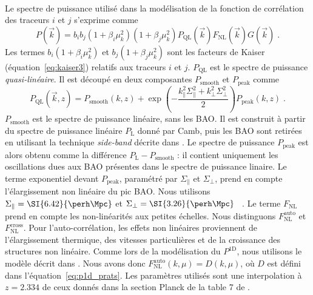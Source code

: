 \paragraph{}
Le spectre de puissance utilisé dans la modélisation de la fonction de corrélation des traceurs $i$ et $j$ s'exprime comme
\begin{equation}
  \label{eq:pk_model1}
  P(\vec k) = b_i b_j (1+\beta_i \mu_k^2)(1+\beta_j \mu_k^2) P_{\mathrm{QL}}(\vec k) F_{\mathrm{NL}}(\vec k) G(\vec k) \; .
\end{equation}
Les termes $b_i (1+\beta_i \mu_k^2)$ et $b_j (1+\beta_j \mu_k^2)$ sont les facteurs de Kaiser (équation~\ref{eq:kaiser3}) relatifs aux traceurs $i$ et $j$.
$P_{\mathrm{QL}}$ est le spectre de puissance \emph{quasi-linéaire}. Il est découpé en deux composantes $P_{\mathrm{smooth}}$ et $P_{\mathrm{peak}}$ comme
\begin{equation}
  \label{eq:pk_ql}
  P_{\mathrm{QL}}(\vec k, z) = P_{\mathrm{smooth}}(k, z) + \exp(- \frac{k_{\parallel}^2 \Sigma_{\parallel}^2 + k_{\perp}^2 \Sigma_{\perp}^2}{2}) P_{\mathrm{peak}}(k,z) \; .
\end{equation}
$P_{\mathrm{smooth}}$ est le spectre de puissance linéaire, sans les BAO. Il est construit à partir du spectre de puissance linéaire $P_{\mathrm{L}}$ donné par Camb, puis les BAO sont retirées en utilisant la technique \emph{side-band} décrite dans \textcite{Kirkby2013}.
Le spectre de puissance $P_{\mathrm{peak}}$ est alors obtenu comme la différence $P_{\mathrm{L}} - P_{\mathrm{smooth}}$ : il contient uniquement les oscillations dues aux BAO présentes dans le spectre de puissance linaire.
Le terme exponentiel devant $P_{\mathrm{peak}}$, paramétré par $\Sigma_{\parallel}$ et $\Sigma_{\perp}$, prend en compte l'élargissement non linéaire du pic BAO. Nous utilisons $\Sigma_{\parallel} = \SI{6.42}{\perh\Mpc}$ et $\Sigma_{\perp} = \SI{3.26}{\perh\Mpc}$ ~\autocite{eisenstein_robustness_2007}.
Le terme $F_{\mathrm{NL}}$ prend en compte les non-linéarités aux petites échelles. Nous distinguons $F_{\mathrm{NL}}^{\mathrm{auto}}$ et $F_{\mathrm{NL}}^{\mathrm{cross}}$. Pour l'auto-corrélation, les effets non linéaires proviennent de l'élargissement thermique, des vitesses particulières et de la croissance des structures non linéaire.
Comme lors de la modélisation du $P^{\mathrm{1D}}$, nous utilisons le modèle décrit dans \textcite{Arinyo-i-Prats2015}. Nous avons donc $F_{\mathrm{NL}}^{\mathrm{auto}}(k, \mu) = D(k, \mu)$, où $D$ est défini dans l'équation~\ref{eq:p1d_prats}. Les paramètres utilisés sont une interpolation à $z = \num{2.334}$ de ceux donnés dans la section \og Planck \fg de la table 7 de \textcite{Arinyo-i-Prats2015}.

